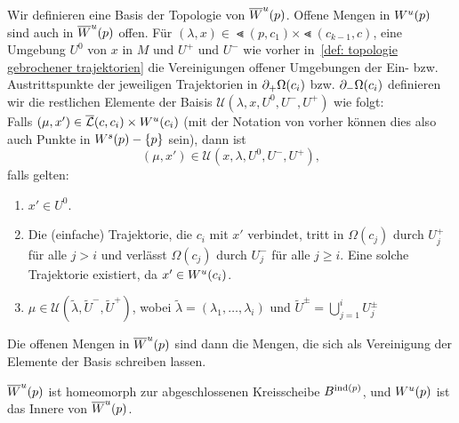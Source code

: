 \begin{definition}
    Wir definieren eine Basis der Topologie von ${ \overline{W}^u } (p)$. Offene Mengen in ${ W^u } (p)$ sind 
    auch in ${ \overline{W}^u } (p)$ offen. Für $(\lambda, x) \in \Lt (p, c_1) \times \Lt (c_{k - 1}, c)$,
    eine Umgebung $U^0$ von $x$ in $M$ und $U^+$ und $U^-$ wie vorher 
    in~\ref{def: topologie gebrochener trajektorien} die Vereinigungen offener Umgebungen der Ein-
    bzw. Austrittspunkte der jeweiligen Trajektorien in ${ \partial }_+ \Omega (c_i)$ bzw. 
    ${ \partial }_- \Omega (c_i)$ definieren wir die restlichen Elemente der Baisis
    $\mathcal{U}(\lambda, x, U^0, U^-, U^+)$ wie folgt: \\
    Falls $(\mu, x') \in {\overline{\mathcal{L}} }(c, c_i) \times { W^u } (c_i)$ (mit der 
    Notation von vorher können dies also auch Punkte in ${ W^s }(p) - \{ p \}$ sein), dann ist 
    \[ (\mu, x') \in \mathcal{U}(x, \lambda, U^0, U^-, U^+) , \]
    falls gelten:
    \begin{enumerate}
        \item $x' \in U^0$.
        \item Die (einfache) Trajektorie, die $c_i$ mit $x'$ verbindet, tritt in $\Omega (c_j)$ durch 
            $U^+_j$ für alle $j > i$ und verlässt $\Omega (c_j)$ durch $U^-_j$ für alle $j \geq i$.
            Eine solche Trajektorie existiert, da $x' \in { W^u } (c_i)$.
        \item $\mu \in \mathcal{U}(\tilde{\lambda}, \tilde{U}^-, \tilde{U}^+)$, wobei 
            $\tilde{\lambda} = (\lambda_1, \dots, \lambda_i)$ und 
            $\tilde{U}^{\pm} = \bigcup_{j = 1}^i U^{\pm}_j$
    \end{enumerate}
    Die offenen Mengen in ${ \overline{W}^u } (p)$ sind dann die Mengen, die sich als Vereinigung der 
    Elemente der Basis schreiben lassen. 
\end{definition}


\begin{example}
    \todo{}
\end{example}

\begin{prop}
    ${ \overline{W}^u } (p)$ ist homeomorph zur abgeschlossenen Kreisscheibe $B^{{ \operatorname{ind} } (p)}$, und 
    ${ W^u } (p)$ ist das Innere von ${ \overline{W}^u } (p)$.
\end{prop}

